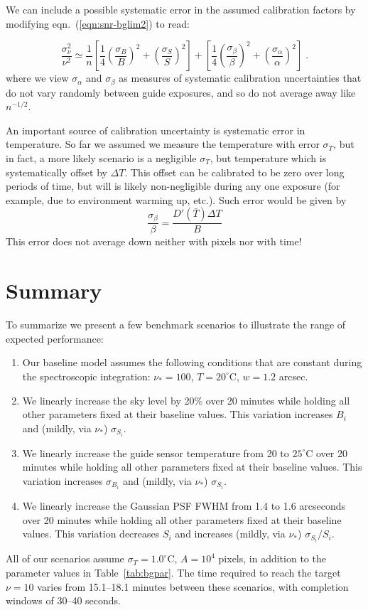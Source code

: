 \documentclass[11pt]{article}
\providecommand{\eqn}[1]{eqn.~(\ref{eqn:#1})}
\providecommand{\tab}[1]{Table~\ref{tab:#1}}
\begin{document}
We can include a possible systematic error in the assumed calibration
factors by modifying \eqn{snr-bglim2} to read:

\begin{equation}
\frac{\sigma_\nu^2}{\nu^2} \simeq \frac{1}{n}\left[
\frac{1}{4} \left(\frac{\sigma_B}{B}\right)^2 +
\left(\frac{\sigma_S}{S}\right)^2\right] + 
\left[
\frac{1}{4} \left(\frac{\sigma_\beta}{\beta}\right)^2 +
\left(\frac{\sigma_\alpha}{\alpha}\right)^2\right]
\; .
\label{eqn:snr-bglim2}
\end{equation}
where we view $\sigma_\alpha$ and $\sigma_\beta$ as measures of systematic calibration uncertainties that do not vary randomly between guide exposures, and so do not average away like $n^{-1/2}$.

An important source of calibration uncertainty is systematic error in
temperature. So far we assumed we measure the temperature with error
$\sigma_T$, but in fact, a more likely scenario is a negligible
$\sigma_T$, but temperature which is systematically offset by $\Delta T$. This
offset can be calibrated to be zero over long periods of time, but
will is likely non-negligible during any one exposure (for example,
due to environment warming up, etc.). Such error would be given by
\begin{equation}
  \frac{\sigma_\beta}{\beta} = \frac{D'(\bar{T})\Delta T}{B}
\end{equation}
This error does not average down neither with pixels nor with time!


\section{Summary}

To summarize we present a few benchmark scenarios to illustrate the range of expected performance:
\begin{enumerate}
\item Our baseline model assumes the following conditions that are constant during the spectroscopic integration: $\nu_{\ast} = 100$, $T = 20^\circ$C, $w = 1.2$ arcsec.
\item We linearly increase the sky level by 20\% over 20 minutes while holding all other parameters fixed at their baseline values. This variation increases $B_i$ and (mildly, via $\nu_{\ast}$) $\sigma_{S_i}$.
\item We linearly increase the guide sensor temperature from 20 to $25^\circ$C over 20 minutes while holding all other parameters fixed at their baseline values. This variation increases $\sigma_{B_i}$ and (mildly, via $\nu_{\ast}$) $\sigma_{S_i}$.
\item We linearly increase the Gaussian PSF FWHM from 1.4 to 1.6 arcseconds over 20 minutes while holding all other parameters fixed at their baseline values. This variation decreases $S_i$ and increases (mildly, via $\nu_{\ast}$) $\sigma_{S_i}/S_i$.
\end{enumerate}
All of our scenarios assume $\sigma_T = 1.0^\circ$C, $A = 10^4$ pixels, in addition to the parameter values in \tab{bgpar}. The time required to reach the target $\nu = 10$ varies from 15.1--18.1 minutes between these scenarios, with completion windows of 30--40 seconds.
\end{document}
